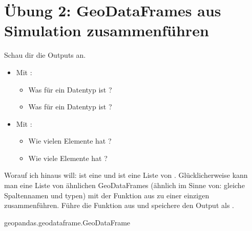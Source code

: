 \documentclass[letterpaper,10pt,english]{sphinxmanual}
\begin{document}
\section{Übung 2: GeoDataFrames aus Simulation zusammenführen}
\label{\detokenize{03_03_Zeckenstich_Simulation:ubung-2-geodataframes-aus-simulation-zusammenfuhren}}
Schau dir die Outputs an.
\begin{itemize}
\item {} 
Mit :
\begin{itemize}
\item {} 
Was für ein Datentyp ist ?

\item {} 
Was für ein Datentyp ist ?

\end{itemize}

\item {} 
Mit :
\begin{itemize}
\item {} 
Wie vielen Elemente hat ?

\item {} 
Wie viele Elemente hat ?

\end{itemize}

\end{itemize}

Worauf ich hinaus will:  ist eine  und  ist eine Liste von . Glücklicherweise kann man eine Liste von ähnlichen GeoDataFrames (ähnlich im Sinne von: gleiche Spaltennamen und \sphinxhyphen{}typen) mit der Funktion  aus  zu einer einzigen  zusammenführen. Führe die Funktion aus und speichere den Output als .

\begin{sphinxVerbatim}[commandchars=\\\{\}]
\end{sphinxVerbatim}

\begin{sphinxVerbatim}[commandchars=\\\{\}]
geopandas.geodataframe.GeoDataFrame
\end{sphinxVerbatim}
\end{document}
